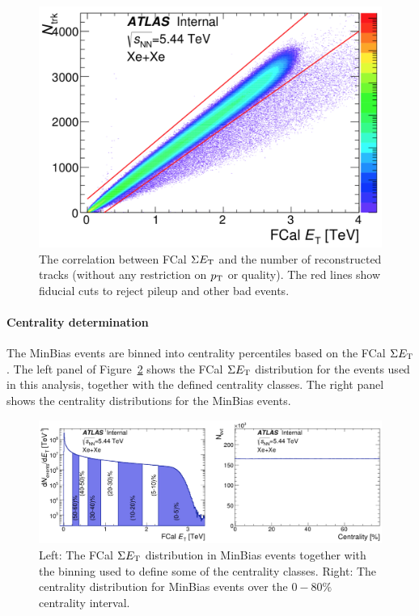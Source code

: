 \begin{figure}[H]
\centering
\includegraphics[width=.6\linewidth]{figs/chapter_detector/ATLAS_FCal_Nch_XeXe544.png}
\caption{The correlation between FCal $\Sigma E_\text{T}$ and the number of reconstructed tracks (without any restriction on $p_\text{T}$ or quality). The red lines show fiducial cuts to reject pileup and other bad events.}
\label{fig:detector_ATLAS_FCal_Nch_XeXe544}
\end{figure}



\paragraph{Centrality determination}

The MinBias events are binned into centrality percentiles based on the FCal $\Sigma E_\text{T}$. The left panel of Figure~\ref{fig:detector_ATLAS_centrality_XeXe544} shows the FCal $\Sigma E_\text{T}$ distribution for the events used in this analysis, together with the defined centrality classes. The right panel shows the centrality distributions for the MinBias events.

\begin{figure}[H]
\centering
\includegraphics[width=.95\linewidth]{figs/chapter_detector/ATLAS_centrality_XeXe544.png}
\caption{Left: The FCal $\Sigma E_\text{T}$ distribution in MinBias events together with the binning used to define some of the centrality classes. Right: The centrality distribution for MinBias events over the $0-80\%$ centrality interval.}
\label{fig:detector_ATLAS_centrality_XeXe544}
\end{figure}

